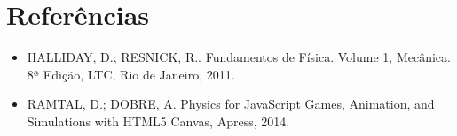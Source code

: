 \documentclass[12pt,a4paper,oneside]{article}
\begin{document}
\section{Referências}

\begin{itemize}
	\item HALLIDAY, D.; RESNICK, R.. Fundamentos de Física. Volume 1, Mecânica. 8ª Edição, LTC, Rio de Janeiro, 2011.

	\item RAMTAL, D.; DOBRE, A. Physics for JavaScript Games, Animation, and Simulations with HTML5 Canvas, Apress, 2014.
\end{itemize}
\end{document}
